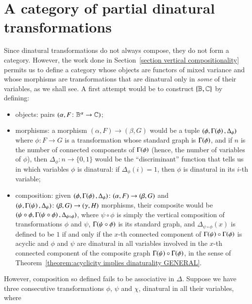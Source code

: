 \section{A category of partial dinatural transformations}

Since dinatural transformations do not always compose, they do not form a category. However, the work done in Section~\ref{section vertical compositionality} permits us to define a category whose objects are functors of mixed variance and whose morphisms are transformations that are dinatural only in \emph{some} of their variables, as we shall see. A first attempt would be to construct $\{ \mathbb B,\mathbb C\}$ by defining:
\begin{itemize}\label{first attempt}
    \item objects:  pairs $(\alpha, F \colon \mathbb B^\alpha \to \mathbb C)$;
    \item morphisms: a morphism $(\alpha, F) \to (\beta, G)$ would be a tuple  $(\phi, \graph\phi, \Delta_\phi)$ where $\phi \colon F \to G$ is a transformation whose standard graph is $\graph\phi$, and if $n$ is the number of connected components of $\graph\phi$ (hence, the number of variables of $\phi$), then $\Delta_\phi \colon n \to \{0,1\}$ would be the ``discriminant'' function that tells us in which variables $\phi$ is dinatural: if $\Delta_\phi(i)=1$, then $\phi$ is dinatural in its $i$-th variable;
    \item composition: given $(\phi,\graph\phi,\Delta_\phi) \colon (\alpha,F) \to (\beta,G)$ and $(\psi,\Gamma\!\left(\psi\right),\Delta_\psi) \colon (\beta,G) \to (\gamma,H)$ morphisms, their composite would be $(\psi\circ\phi,\graph{\psi\circ\phi},\Delta_{\psi\circ\phi})$, where $\psi\circ\phi$ is simply the vertical composition of transformations $\phi$ and $\psi$, $\graph{\psi\circ\phi}$ is its standard graph, and $\Delta_{\psi\circ\phi}(x)$ is defined to be $1$ if and only if the $x$-th connected component of $\graph\psi \circ \graph\phi$ is acyclic and $\phi$ and $\psi$ are dinatural in all variables involved in the $x$-th connected component of the composite graph $\graph{\psi}\circ\graph\phi$, in the sense of Theorem~\ref{theorem:acyclicity implies dinaturality GENERAL}.
\end{itemize}
However, composition so defined fails to be associative in $\Delta$. Suppose we have three consecutive transformations $\phi$, $\psi$ and $\chi$, dinatural in all their variables, where
